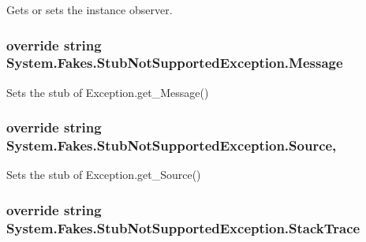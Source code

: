 Gets or sets the instance observer.

\hypertarget{class_system_1_1_fakes_1_1_stub_not_supported_exception_a10e70da4ee636db3be01bc7520f88da5}{
\subsubsection[{Message}]{\setlength{\rightskip}{0pt plus 5cm}override string System.\-Fakes.\-Stub\-Not\-Supported\-Exception.\-Message\hspace{0.3cm}{\ttfamily [get]}}}\label{class_system_1_1_fakes_1_1_stub_not_supported_exception_a10e70da4ee636db3be01bc7520f88da5}


Sets the stub of Exception.\-get\-\_\-\-Message()

\hypertarget{class_system_1_1_fakes_1_1_stub_not_supported_exception_acc44c9e744891a4cbdc430c839f58744}{
\subsubsection[{Source}]{\setlength{\rightskip}{0pt plus 5cm}override string System.\-Fakes.\-Stub\-Not\-Supported\-Exception.\-Source\hspace{0.3cm}{\ttfamily [get]}, {\ttfamily [set]}}}\label{class_system_1_1_fakes_1_1_stub_not_supported_exception_acc44c9e744891a4cbdc430c839f58744}


Sets the stub of Exception.\-get\-\_\-\-Source()

\hypertarget{class_system_1_1_fakes_1_1_stub_not_supported_exception_ac2cfe0927b03f24b2678f4184dd5958f}{
\subsubsection[{Stack\-Trace}]{\setlength{\rightskip}{0pt plus 5cm}override string System.\-Fakes.\-Stub\-Not\-Supported\-Exception.\-Stack\-Trace\hspace{0.3cm}{\ttfamily [get]}}}\label{class_system_1_1_fakes_1_1_stub_not_supported_exception_ac2cfe0927b03f24b2678f4184dd5958f}


